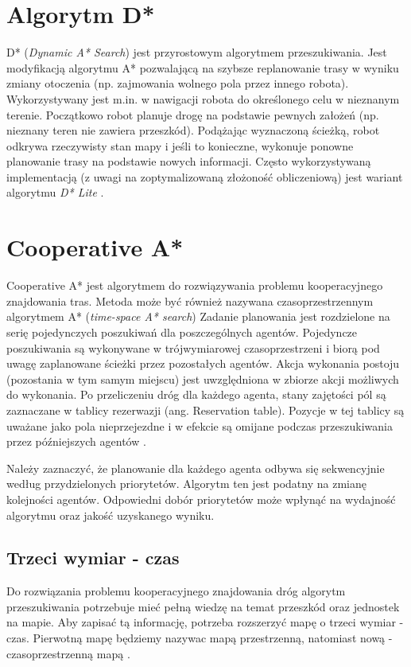 \section{Algorytm D*}
\label{ch:dstar}
D* ({\it Dynamic A* Search}) jest przyrostowym algorytmem przeszukiwania. Jest modyfikacją algorytmu A* pozwalającą na szybsze replanowanie trasy w wyniku zmiany otoczenia (np. zajmowania wolnego pola przez innego robota). Wykorzystywany jest m.in. w nawigacji robota do określonego celu w nieznanym terenie. Początkowo robot planuje drogę na podstawie pewnych założeń (np. nieznany teren nie zawiera przeszkód). Podążając wyznaczoną ścieżką, robot odkrywa rzeczywisty stan mapy i jeśli to konieczne, wykonuje ponowne planowanie trasy na podstawie nowych informacji.
Często wykorzystywaną implementacją (z uwagi na zoptymalizowaną złożoność obliczeniową) jest wariant algorytmu {\it D* Lite} \cite{dstarlite}.

\section{Cooperative A*}
Cooperative A* jest algorytmem do rozwiązywania problemu kooperacyjnego znajdowania tras.
Metoda może być również nazywana czasoprzestrzennym algorytmem A* ({\it time-space A* search})
Zadanie planowania jest rozdzielone na serię pojedynczych poszukiwań dla poszczególnych agentów.
Pojedyncze poszukiwania są wykonywane w trójwymiarowej czasoprzestrzeni i biorą pod uwagę zaplanowane ścieżki przez pozostałych agentów.
Akcja wykonania postoju (pozostania w tym samym miejscu) jest uwzględniona w zbiorze akcji możliwych do wykonania.
Po przeliczeniu dróg dla każdego agenta, stany zajętości pól są zaznaczane w tablicy rezerwazji (ang. Reservation table).
Pozycje w tej tablicy są uważane jako pola nieprzejezdne i w efekcie są omijane podczas przeszukiwania przez późniejszych agentów \cite{cooppath}.

Należy zaznaczyć, że planowanie dla każdego agenta odbywa się sekwencyjnie według przydzielonych priorytetów.
Algorytm ten jest podatny na zmianę kolejności agentów. Odpowiedni dobór priorytetów może wpłynąć na wydajność algorytmu oraz jakość uzyskanego wyniku.

\subsection{Trzeci wymiar - czas}
Do rozwiązania problemu kooperacyjnego znajdowania dróg algorytm przeszukiwania potrzebuje mieć pełną wiedzę na temat przeszkód oraz jednostek na mapie.
Aby zapisać tą informację, potrzeba rozszerzyć mapę o trzeci wymiar - czas. 
Pierwotną mapę będziemy nazywac mapą przestrzenną, natomiast nową - czasoprzestrzenną mapą \cite{cooppath}.

